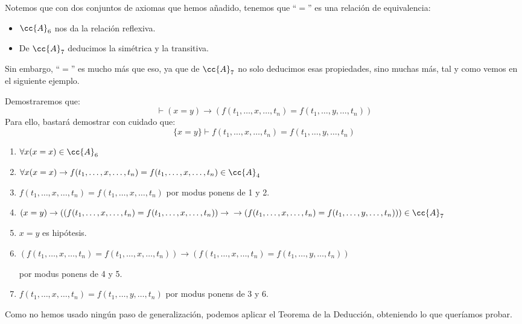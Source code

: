 \begin{observacion}
    Notemos que con dos conjuntos de axiomas que hemos añadido, tenemos que ``$=$'' es una relación de equivalencia:
    \begin{itemize}
        \item $\cc{A}_6$ nos da la relación reflexiva.
        \item De $\cc{A}_7$ deducimos la simétrica y la transitiva.
    \end{itemize}
    Sin embargo, ``$=$'' es mucho más que eso, ya que de $\cc{A}_7$ no solo deducimos esas propiedades, sino muchas más, tal y como vemos en el siguiente ejemplo.
\end{observacion}

\begin{ejemplo}
    Demostraremos que:
    \begin{equation*}
        \vdash (x=y) \to (f(t_1,\ldots,x,\ldots,t_n) = f(t_1,\ldots,y,\ldots,t_n))
    \end{equation*}
    Para ello, bastará demostrar con cuidado que:
    \begin{equation*}
        \{x=y\} \vdash f(t_1,\ldots,x,\ldots,t_n) = f(t_1,\ldots,y,\ldots,t_n)
    \end{equation*}
    \begin{enumerate}
        \item $\forall x(x=x)\in \cc{A}_6$ 
        \item $\forall x(x=x)\to f(t_1,\dots,x,\dots,t_n)=f(t_1,\dots,x,\dots,t_n)\in \cc{A}_4$
        \item $f(t_1,\dots,x,\dots,t_n)=f(t_1,\dots,x,\dots,t_n)$ por modus ponens de 1 y 2.
        \item $(x=y)\to ((f(t_1,\dots,x,\dots,t_n)=f(t_1,\dots,x,\dots,t_n))\to \\ \to (f(t_1,\dots,x,\dots,t_n)=f(t_1,\dots,y,\dots,t_n))) \in \cc{A}_7$
        \item $x=y$ es hipótesis.
        \item $(f(t_1,\ldots,x,\ldots,t_n)=f(t_1,\ldots,x,\ldots,t_n))\to (f(t_1,\ldots,x,\ldots,t_n)=f(t_1,\ldots,y,\ldots,t_n))$ 

            por modus ponens de 4 y 5.
        \item $f(t_1,\ldots,x,\ldots,t_n)=f(t_1,\ldots,y,\ldots,t_n)$ por modus ponens de 3 y 6.
    \end{enumerate}
    Como no hemos usado ningún paso de generalización, podemos aplicar el Teorema de la Deducción, obteniendo lo que queríamos probar.
\end{ejemplo}
